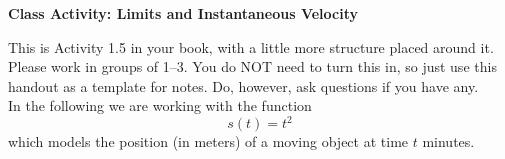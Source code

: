 \documentclass[11pt]{article}
\begin{document}
	
	\thispagestyle{empty}
	\renewcommand{\headrulewidth}{0.0pt}
	\thispagestyle{fancy}
	\lfoot{}
	\cfoot{}
	\rfoot{}	
	
	\vspace*{0in}

		\begin{center}
			\begin{large}
			\textbf{Class Activity: Limits and Instantaneous Velocity} \\
			\end{large}
		\end{center}
		
This is Activity 1.5 in your book, with a little more structure placed around it. Please work in groups of 1--3. You do NOT need to turn this in, so just use this handout as a template for notes. Do, however, ask questions if you have any. \\

In the following we are working with the function 
\[ s(t) = t^2 \]
which models the position (in meters) of a moving object at time $t$ minutes. 
\end{document}
